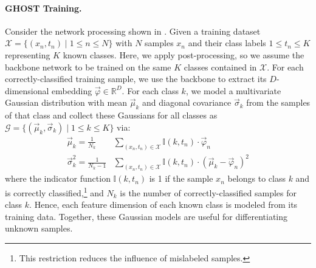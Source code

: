 \paragraph{GHOST Training.} Consider the network processing shown in .
Given a training dataset $\mathcal X=\{(x_n,t_n)\mid 1\leq n\leq N\}$ with $N$ samples $x_n$ and their class labels $1\leq t_n\leq K$ representing $K$ known classes.
Here, we apply post-processing, so we assume the backbone network to be trained on the same $K$ classes contained in $\mathcal X$.
For each correctly-classified training sample, we use the backbone to extract its $D$-dimensional embedding $\vec\varphi\in\mathbb R^D$.
For each class $k$, we model a multivariate Gaussian distribution with mean $\vec \mu_k$ and diagonal covariance $\vec\sigma_k$ from the samples of that class and collect these Gaussians for all classes as $\mathcal G = \{(\vec\mu_k, \vec\sigma_k)\mid 1\leq k\leq K\}$ via:
\begin{equation}
    \begin{aligned}
    \vec\mu_k = \frac1{N_k}&\sum\limits_{(x_n,t_n)\in\mathcal X} \mathbb I(k,t_n)\cdot \vec\varphi_n  \\ 
    \vec\sigma_k^2 = \frac1{N_k-1}&\sum\limits_{(x_n,t_n)\in\mathcal X} \mathbb I(k,t_n)\cdot(\vec\mu_k-\vec\varphi_n)^2
    \end{aligned}
\end{equation}
where the indicator function $\mathbb I(k,t_n)$ is 1 if the sample $x_n$ belongs to class $k$ and is correctly classified,\footnote{This restriction reduces the influence of mislabeled samples.} and $N_k$ is the number of correctly-classified samples for class $k$.
Hence, each feature dimension of each known class is modeled from its training data.
Together, these Gaussian models are useful for differentiating unknown samples.


\iffalse
\begin{algorithm}
\SetKwInOut{Input}{Input}\SetKwInOut{Output}{Output}
  \Input{A training dataset $T$, containing $K$ classes. }
  \Input{$F(x)$, a DNN's an $N$-dimensional pre-logit feature Vector of sample $x$;  $F(x)[n]$ be the value at dimension $n$ of $F(x)$}
  \Output{Vector of Gauss\_models with mean and standard deviations}
  \Begin{
  Gauss\_models = $\emptyset$\;
  \For{ $k \in K$:}{
	FVect = $F(\forall x \in T$ from class $k$)\  //tensor of feature vectors\;
        \For{ $n \in N$}{
        $\mu_{n,k} = $ Mean(FVect[n])\  // mean at dim $n$ over samples from $k$\;
        $\sigma_{n,k} = $ STD(FVect[n])\;
        }
	  Gauss\_models[k] = $[\mu_{n,k},\sigma_{n,k}]$\;
  }
   return Gauss\_models\;
  }
  \caption{Computing per-dimensional Gaussian models over training data $T$}
  \label{a:gmodel}
\end{algorithm}
\fi

